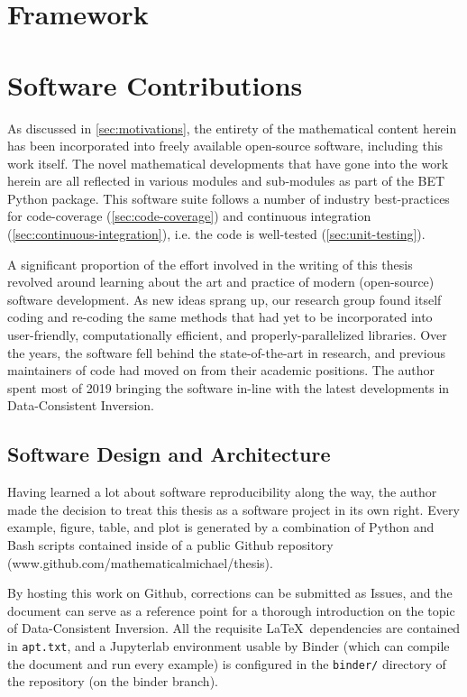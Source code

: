 \section{Framework}\label{sec:framework}






\section{Software Contributions}\label{sec:ch01-software}

As discussed in \ref{sec:motivations}, the entirety of the mathematical content herein has been incorporated into freely available open-source software, including this work itself.
The novel mathematical developments that have gone into the work herein are all reflected in various modules and sub-modules as part of the BET Python package.
This software suite follows a number of industry best-practices for code-coverage (\ref{sec:code-coverage}) and continuous integration (\ref{sec:continuous-integration}), i.e. the code is well-tested (\ref{sec:unit-testing}).

A significant proportion of the effort involved in the writing of this thesis revolved around learning about the art and practice of modern (open-source) software development.
As new ideas sprang up, our research group found itself coding and re-coding the same methods that had yet to be incorporated into user-friendly, computationally efficient, and properly-parallelized libraries.
Over the years, the software fell behind the state-of-the-art in research, and previous maintainers of code had moved on from their academic positions.
The author spent most of 2019 bringing the software in-line with the latest developments in Data-Consistent Inversion.


\subsection{Software Design and Architecture}\label{sec:architecture}

Having learned a lot about software reproducibility along the way, the author made the decision to treat this thesis as a software project in its own right.
Every example, figure, table, and plot is generated by a combination of Python and Bash scripts contained inside of a public Github repository (www.github.com/mathematicalmichael/thesis).

By hosting this work on Github, corrections can be submitted as Issues, and the document can serve as a reference point for a thorough introduction on the topic of Data-Consistent Inversion.
All the requisite \LaTeX~dependencies are contained in {\tt apt.txt}, and a Jupyterlab environment usable by Binder (which can compile the document and run every example) is configured in the {\tt binder/} directory of the repository (on the binder branch).

